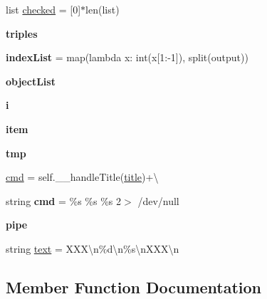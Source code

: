 \begin{DoxyCompactItemize}
\item 
list \hyperlink{classdialog_1_1_dialog_a7aba8e996b51d4646719386b385eef67}{checked} = \mbox{[}0\mbox{]}$\ast$len(list)
\item 
{\bfseries triples}
\item 
{\bfseries index\+List} = map(lambda x\+: int(x\mbox{[}1\+:-\/1\mbox{]}), split(output))\hypertarget{classdialog_1_1_dialog_acec905c1969084b620a9c892b08aa965}{}\label{classdialog_1_1_dialog_acec905c1969084b620a9c892b08aa965}

\item 
{\bfseries object\+List}
\item 
{\bfseries i}\hypertarget{classdialog_1_1_dialog_ae7713806c56d3ededc2fb33ed5fa7cb2}{}\label{classdialog_1_1_dialog_ae7713806c56d3ededc2fb33ed5fa7cb2}

\item 
{\bfseries item}\hypertarget{classdialog_1_1_dialog_abebe5646bd481e12b1fda922093cca01}{}\label{classdialog_1_1_dialog_abebe5646bd481e12b1fda922093cca01}

\item 
{\bfseries tmp}\hypertarget{classdialog_1_1_dialog_aa1011ae2142e880fbaada08af58d73ef}{}\label{classdialog_1_1_dialog_aa1011ae2142e880fbaada08af58d73ef}

\item 
\hyperlink{classdialog_1_1_dialog_ab6a920ce7ea89873b4dfe4f8a2aa57a4}{cmd} = self.\+\_\+\+\_\+handle\+Title(\hyperlink{classdialog_1_1_dialog_a0ba5ed1f2029a13c537ea89ace62176a}{title})+\textbackslash{}
\item 
string {\bfseries cmd} = \textquotesingle{}\%s \%s \%s 2$>$ /dev/null\textquotesingle{}\hypertarget{classdialog_1_1_dialog_a617eb84c6dd69173db5abe130042f2a3}{}\label{classdialog_1_1_dialog_a617eb84c6dd69173db5abe130042f2a3}

\item 
{\bfseries pipe}\hypertarget{classdialog_1_1_dialog_adcc594cb1779c372d93435cf2230ea8b}{}\label{classdialog_1_1_dialog_adcc594cb1779c372d93435cf2230ea8b}

\item 
string \hyperlink{classdialog_1_1_dialog_ac6496479083764dc18d577e5becfa467}{text} = \textquotesingle{}X\+X\+X\textbackslash{}n\%d\textbackslash{}n\%s\textbackslash{}n\+X\+X\+X\textbackslash{}n\textquotesingle{}
\end{DoxyCompactItemize}


\subsection{Member Function Documentation}
